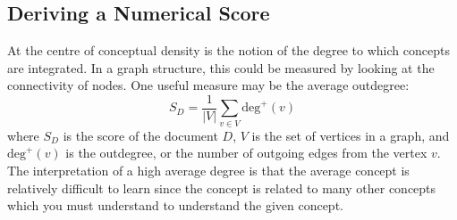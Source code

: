 \documentclass[12pt]{article}
\theoremstyle{grammarstyle}
\begin{document}


\subsection{Deriving a Numerical Score} \label{sec:quantifying_conceptual_density}
At the centre of conceptual density is the notion of the degree to which concepts are integrated. In a graph structure, this could be measured by looking at the connectivity of nodes. One useful measure may be the average outdegree:
\begin{equation} \label{eq:simple score}
    S_D = \frac{1}{|V|} \sum_{v \in V} \text{deg}^+(v)
\end{equation}
where $S_D$ is the score of the document $D$, $V$ is the set of vertices in a graph,  and $\text{deg}^+(v)$ is the outdegree, or the number of outgoing edges from the vertex $v$. The interpretation of a high average degree is that the average concept is relatively difficult to learn since the concept is related to many other concepts which you must understand to understand the given concept. 
\end{document}
